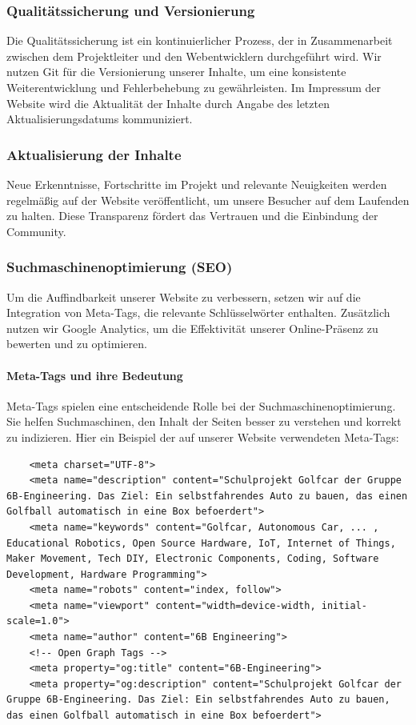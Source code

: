 \subsubsection{Qualitätssicherung und Versionierung}

Die Qualitätssicherung ist ein kontinuierlicher Prozess, der in Zusammenarbeit zwischen dem Projektleiter und den Webentwicklern durchgeführt wird. Wir nutzen Git für die Versionierung unserer Inhalte, um eine konsistente Weiterentwicklung und Fehlerbehebung zu gewährleisten. Im Impressum der Website wird die Aktualität der Inhalte durch Angabe des letzten Aktualisierungsdatums kommuniziert.

\subsubsection{Aktualisierung der Inhalte}

Neue Erkenntnisse, Fortschritte im Projekt und relevante Neuigkeiten werden regelmäßig auf der Website veröffentlicht, um unsere Besucher auf dem Laufenden zu halten. Diese Transparenz fördert das Vertrauen und die Einbindung der Community.

\subsubsection{Suchmaschinenoptimierung (SEO)}

Um die Auffindbarkeit unserer Website zu verbessern, setzen wir auf die Integration von Meta-Tags, die relevante Schlüsselwörter enthalten. Zusätzlich nutzen wir Google Analytics, um die Effektivität unserer Online-Präsenz zu bewerten und zu optimieren.

\paragraph{Meta-Tags und ihre Bedeutung}
Meta-Tags spielen eine entscheidende Rolle bei der Suchmaschinenoptimierung. Sie helfen Suchmaschinen, den Inhalt der Seiten besser zu verstehen und korrekt zu indizieren. Hier ein Beispiel der auf unserer Website verwendeten Meta-Tags:

\begin{lstlisting}
    <meta charset="UTF-8">
    <meta name="description" content="Schulprojekt Golfcar der Gruppe 6B-Engineering. Das Ziel: Ein selbstfahrendes Auto zu bauen, das einen Golfball automatisch in eine Box befoerdert">
    <meta name="keywords" content="Golfcar, Autonomous Car, ... , Educational Robotics, Open Source Hardware, IoT, Internet of Things, Maker Movement, Tech DIY, Electronic Components, Coding, Software Development, Hardware Programming">
    <meta name="robots" content="index, follow">
    <meta name="viewport" content="width=device-width, initial-scale=1.0">
    <meta name="author" content="6B Engineering">
    <!-- Open Graph Tags -->
    <meta property="og:title" content="6B-Engineering">
    <meta property="og:description" content="Schulprojekt Golfcar der Gruppe 6B-Engineering. Das Ziel: Ein selbstfahrendes Auto zu bauen, das einen Golfball automatisch in eine Box befoerdert">
\end{lstlisting}

